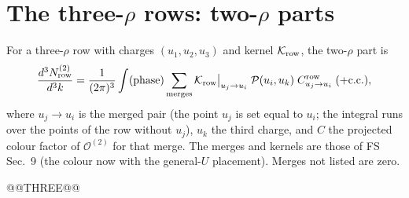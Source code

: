 \documentclass[10pt]{article}
\numberwithin{equation}{section}
\newcommand{\OO}{\mathcal O}
\newcommand{\KK}{\mathcal K}
\newcommand{\PP}{\mathcal P}
\newcommand{\pre}{\frac{1}{(2\pi)^3}}
\begin{document}
\section{The three-\texorpdfstring{$\rho$}{rho} rows: two-\texorpdfstring{$\rho$}{rho} parts}\label{sec:three}
For a three-$\rho$ row with charges $(u_1,u_2,u_3)$ and kernel $\KK_{\rm row}$, the two-$\rho$ part is
\begin{equation}
\frac{d^3N^{(2)}_{\rm row}}{d^3k}=\pre\int(\text{phase})\sum_{\rm merges}\KK_{\rm row}\big|_{u_j\to u_i}\;\PP(u_i,u_k)\;C^{\rm row}_{u_j\to u_i}\;(+{\rm c.c.}),
\label{eq:three}
\end{equation}
where $u_j\to u_i$ is the merged pair (the point $u_j$ is set equal to $u_i$; the integral runs over the points of the row without $u_j$), $u_k$ the third charge, and $C$ the projected colour factor of $\OO^{(2)}$ for that merge. The merges and kernels are those of FS Sec.~9 (the colour now with the general-$U$ placement). Merges not listed are zero.

@@THREE@@

\end{document}
